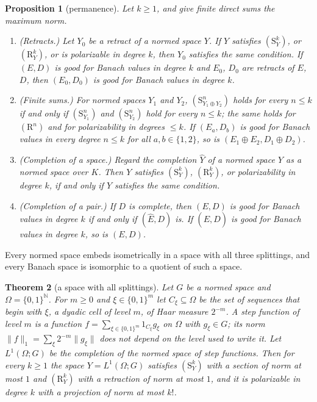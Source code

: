 \documentclass[11pt]{amsart}
\newtheorem{theorem}{Theorem}[section]
\newtheorem{proposition}[theorem]{Proposition}
\theoremstyle{definition}
\theoremstyle{remark}
\numberwithin{equation}{section}
\newcommand{\N}{\mathbb N}
\newcommand{\norm}[1]{\lVert #1\rVert}
\theoremstyle{plain}
\theoremstyle{definition}
\theoremstyle{plain}
\begin{document}
\begin{proposition}[permanence]\label{cmb:prop:permanence}
Let $k\ge1$, and give finite direct sums the maximum norm.
\begin{enumerate}
\item \textup{(Retracts.)} Let $Y_0$ be a retract of a normed space $Y$. If $Y$ satisfies $(\mathrm S^k_Y)$, or
$(\mathrm R^k_Y)$, or is polarizable in degree $k$, then $Y_0$ satisfies the same condition. If $(E,D)$ is good for Banach
values in degree $k$ and $E_0$, $D_0$ are retracts of $E$, $D$, then $(E_0,D_0)$ is good for Banach values in degree $k$.
\item \textup{(Finite sums.)} For normed spaces $Y_1$ and $Y_2$, $(\mathrm S^n_{Y_1\oplus Y_2})$ holds for every $n\le k$ if
and only if $(\mathrm S^n_{Y_1})$ and $(\mathrm S^n_{Y_2})$ hold for every $n\le k$; the same holds for $(\mathrm R^n)$ and
for polarizability in degrees $\le k$. If $(E_a,D_b)$ is good for Banach values in every degree $n\le k$ for all
$a,b\in\{1,2\}$, so is $(E_1\oplus E_2,D_1\oplus D_2)$.
\item \textup{(Completion of a space.)} Regard the completion $\widehat Y$ of a normed space $Y$ as a normed space over
$K$. Then $Y$ satisfies $(\mathrm S^k_Y)$, $(\mathrm R^k_Y)$, or polarizability in degree $k$, if and only if $\widehat Y$
satisfies the same condition.
\item \textup{(Completion of a pair.)} If $D$ is complete, then $(E,D)$ is good for Banach values in degree $k$ if and only
if $(\widehat E,D)$ is. If $(E,\widehat D)$ is good for Banach values in degree $k$, so is $(E,D)$.
\end{enumerate}
\end{proposition}

Every normed space embeds isometrically in a space with all three splittings, and every Banach space is isomorphic to a
quotient of such a space.

\begin{theorem}[a space with all splittings]\label{cmb:thm:cantor}
Let $G$ be a normed space and $\Omega=\{0,1\}^{\N}$. For $m\ge0$ and $\xi\in\{0,1\}^m$ let $C_\xi\subseteq\Omega$ be the
set of sequences that begin with $\xi$, a dyadic cell of level $m$, of Haar measure $2^{-m}$. A step function of level $m$
is a function $f=\sum_{\xi\in\{0,1\}^m}1_{C_\xi}g_\xi$ on $\Omega$ with $g_\xi\in G$; its norm
$\norm f_1=\sum_\xi2^{-m}\norm{g_\xi}$ does not depend on the level used to write it. Let $L^1(\Omega;G)$ be the
completion of the normed space of step functions. Then for every $k\ge1$ the space $Y=L^1(\Omega;G)$ satisfies
$(\mathrm S^k_Y)$ with a section of norm at most $1$ and $(\mathrm R^k_Y)$ with a retraction of norm at most $1$, and it is
polarizable in degree $k$ with a projection of norm at most $k!$.
\end{theorem}
\end{document}
